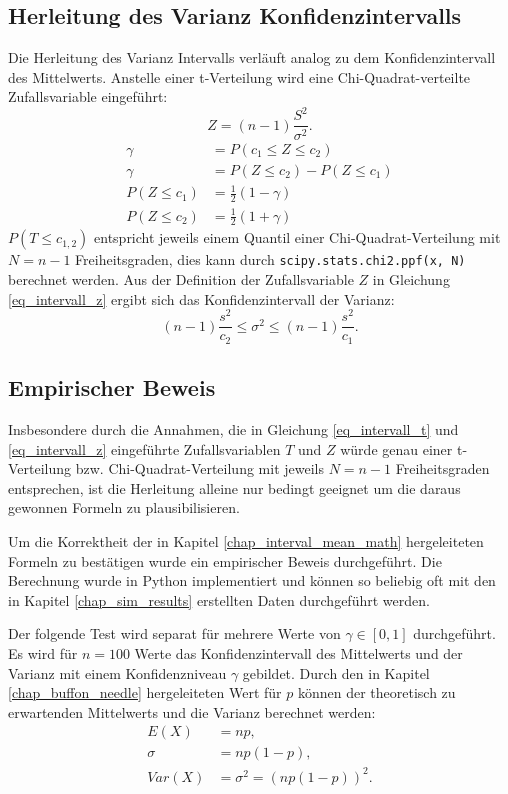 \documentclass[10pt,twocolumn]{scrartcl}
\begin{document}
	\subsection{Herleitung des Varianz Konfidenzintervalls}
		\label{chap_interval_var_math}
		Die Herleitung des Varianz Intervalls verläuft analog zu dem Konfidenzintervall  des Mittelwerts. Anstelle einer t-Verteilung wird eine Chi-Quadrat-verteilte Zufallsvariable eingeführt:
		\begin{equation} \label{eq_intervall_z}
		Z = (n-1)\frac{S^2}{\sigma^2} .
		\end{equation}
		\begin{align}
		\gamma &= P(c_1 \le Z \le c_2) \\
		\gamma &= P(Z \le c_2) - P(Z \le c_1) \nonumber \\
		P(Z \le c_1) &= \frac{1}{2} (1-\gamma) \\
		P(Z \le c_2) &= \frac{1}{2} (1+\gamma)
		\end{align}
		$P(T \le c_{1,2})$ entspricht jeweils einem Quantil einer Chi-Quadrat-Verteilung mit $N = n-1$ Freiheitsgraden, dies kann durch \texttt{scipy.stats.chi2.ppf(x, N)} berechnet werden.
		Aus der Definition der Zufallsvariable $Z$ in Gleichung \ref{eq_intervall_z} ergibt sich das Konfidenzintervall der Varianz:
		\begin{equation}
		(n-1)  \frac{s^2}{c_2} \le \sigma^2 \le (n-1)  \frac{s^2}{c_1}.
		\end{equation}

	\subsection{Empirischer Beweis}
		Insbesondere durch die Annahmen, die in Gleichung \ref{eq_intervall_t} und \ref{eq_intervall_z} eingeführte  Zufallsvariablen $T$ und $Z$ würde genau einer t-Verteilung bzw. Chi-Quadrat-Verteilung mit jeweils $N = n-1$ Freiheitsgraden entsprechen, ist die Herleitung alleine nur bedingt geeignet um die daraus gewonnen Formeln zu plausibilisieren.

		Um die Korrektheit der in Kapitel \ref{chap_interval_mean_math} hergeleiteten Formeln zu bestätigen wurde ein empirischer Beweis durchgeführt. Die Berechnung wurde in Python implementiert und können so beliebig oft mit den in Kapitel \ref{chap_sim_results} erstellten Daten durchgeführt werden.

		Der folgende Test wird separat für mehrere Werte von $\gamma \in [0, 1]$ durchgeführt. Es wird für $n = 100$ Werte das Konfidenzintervall des Mittelwerts und der Varianz mit einem Konfidenzniveau $\gamma$ gebildet. Durch den in Kapitel \ref{chap_buffon_needle} hergeleiteten Wert für $p$ können der theoretisch zu erwartenden Mittelwerts und die Varianz berechnet  werden:
		\begin{align}
		E(X) &= n p , \\
		\sigma &= n p (1-p) , \nonumber \\
		Var(X) &= \sigma^2 = (n p (1-p))^2 .
		\end{align}
\end{document}
